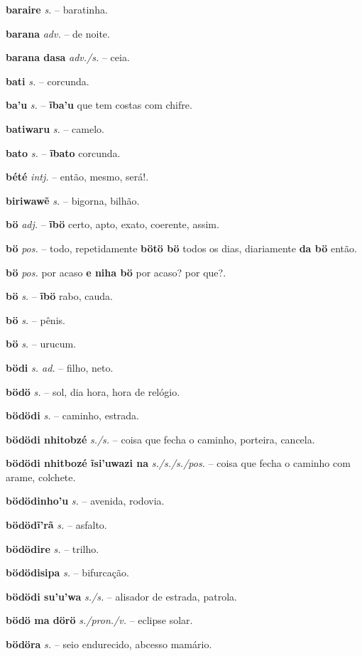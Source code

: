 \textbf{baraire} \textit{s.} -- baratinha.

\textbf{barana} \textit{adv.} -- de noite.

\textbf{barana dasa} \textit{adv./s.} -- ceia.

\textbf{bati} \textit{s.} -- corcunda.

\textbf{ba'u} \textit{s.} -- \textbf{ĩba'u} que tem costas com chifre.

\textbf{batiwaru} \textit{s.} -- camelo.

\textbf{bato} \textit{s.} -- \textbf{ĩbato} corcunda.

\textbf{bété} \textit{intj.} -- então, mesmo, será!.

\textbf{biriwawẽ} \textit{s.} -- bigorna, bilhão.

\textbf{bö} \textit{adj.} -- \textbf{ĩbö} certo, apto, exato, coerente, assim.

\textbf{bö} \textit{pos.} -- todo, repetidamente  \textbf{bötö bö} todos os dias, diariamente  \textbf{da bö} então.

\textbf{bö} \textit{pos.} por acaso  \textbf{e niha bö} por acaso? por que?.

\textbf{bö} \textit{s.} -- \textbf{ĩbö} rabo, cauda.

\textbf{bö} \textit{s.} -- pênis.

\textbf{bö} \textit{s.} -- urucum.

\textbf{bödi} \textit{s. ad.} -- filho, neto.

\textbf{bödö} \textit{s.} -- sol, dia hora, hora de relógio.

\textbf{bödödi} \textit{s.} -- caminho, estrada.

\textbf{bödödi nhitobzé} \textit{s./s.} -- coisa que fecha o caminho, porteira, cancela.

\textbf{bödödi nhitbozé ĩsi'uwazi na} \textit{s./s./s./pos.} -- coisa que fecha o caminho com arame, colchete.

\textbf{bödödinho'u} \textit{s.} -- avenida, rodovia.

\textbf{bödödĩ'rã} \textit{s.} -- asfalto.

\textbf{bödödire} \textit{s.} -- trilho.

\textbf{bödödisipa} \textit{s.} -- bifurcação.

\textbf{bödödi su'u'wa} \textit{s./s.} -- alisador de estrada, patrola.

\textbf{bödö ma dörö} \textit{s./pron./v.} -- eclipse solar.

\textbf{bödöra} \textit{s.} -- seio endurecido, abcesso mamário.

